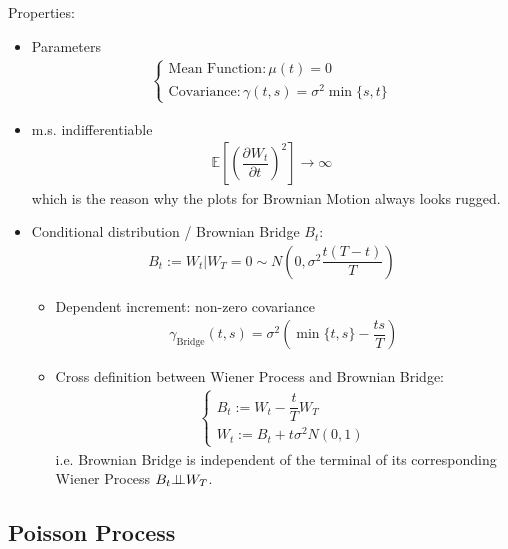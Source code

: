 Properties:
\begin{itemize}[topsep=2pt,itemsep=0pt]
        \item Parameters
        \begin{align}
            \begin{cases}
                \text{Mean Function}:\mu (t)=0\\
                \text{Covariance}:\gamma (t,s)=\sigma ^2 \min\{s,t\} 
            \end{cases} 
        \end{align}
        \item m.s. indifferentiable
        \begin{align}
            \mathbb{E}\left[ \left(\dfrac{\partial^{} W_t}{\partial t^{}}\right)^2 \right]\to \infty  
        \end{align}
        which is the reason why the plots for Brownian Motion always looks rugged.
        \item Conditional distribution / Brownian Bridge $ B_t $:
        \begin{align}
            B_t := W_t|W_T=0 \sim N(0,\sigma ^2\dfrac{t(T-t)}{T})
        \end{align}
        \begin{itemize}[topsep=2pt,itemsep=0pt]
            \item Dependent increment: non-zero covariance
        \begin{align}
            \gamma_\mathrm{Bridge}  (t,s) = \sigma ^2\left(\min\{t,s\}-\dfrac{ts}{T}\right)
        \end{align}
            \item Cross definition between Wiener Process and Brownian Bridge:
            \begin{align}
                \begin{cases}
                    B_t:=W_t-\dfrac{t}{T}W_T\\
                    W_t:=B_t+t \sigma ^2 N(0,1) 
                \end{cases}
            \end{align}
            i.e. Brownian Bridge is independent of the terminal of its corresponding Wiener Process $ B_t\bot\!\!\!\bot W_T $.
        \end{itemize}
\end{itemize}

\subsection{Poisson Process}\label{SubSubSectionPoissonProcess}
\hypertarget{PoissonProcess}{}

